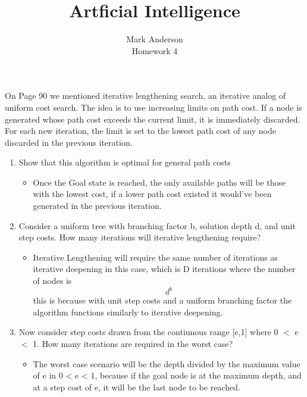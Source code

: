 \documentclass[12pt]{article}
\begin{document}
 
\title{Artficial Intelligence} 
\author{Mark Anderson\\ 
Homework 4} 
 
\maketitle
On Page 90 we mentioned iterative lengthening search, an iterative analog of uniform cost search.  The idea is to use increasing limits on path cost.  If a node is generated whose path cost exceeds the current limit, it is immediately discarded.  For each new iteration, the limit is set to the lowest path cost of any node discarded in the previous iteration.
\begin{enumerate}
  \item Show that this algorithm is optimal for general path costs \par
    \begin{itemize}
      \item Once the Goal state is reached, the only available paths will be those with the lowest cost, if a lower path cost existed it would've been generated in the previous iteration. 
    \end{itemize}
  \item Consider a uniform tree with branching factor b, solution depth d, and unit step costs.  How many iterations will iterative lengthening require?
    \begin{itemize}
      \item Iterative Lengthening will require the same number of iterations as iterative deepening in this case, which is D iterations where the number of nodes is \[d^b\] this is because with unit step costs and a uniform branching factor the algorithm functions similarly to iterative deepening.
    \end{itemize}
  \item Now consider step costs drawn from the contiunous range [e,1] where 0 $<$ e $<$ 1.  How many iterations are required in the worst case?
    \begin{itemize}
      \item The worst case scenario will be the depth divided by the maximum value of e in 0 < e < 1, because if the goal node is at the maximum depth, and at a step cost of e, it will be the last node to be reached. 
    \end{itemize}

\end{enumerate}
\end{document}
